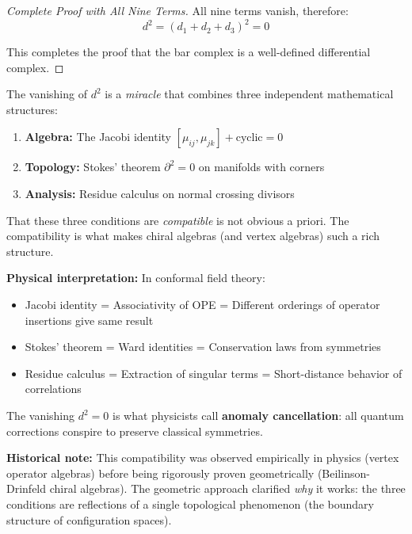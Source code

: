 \begin{proof}[Complete Proof with All Nine Terms]
All nine terms vanish, therefore:
$$d^2 = (d_1 + d_2 + d_3)^2 = 0$$

This completes the proof that the bar complex is a well-defined differential complex.
\end{proof}

\begin{remark}\label{rem:geometric-miracle}
The vanishing of $d^2$ is a \emph{miracle} that combines three independent mathematical structures:

\begin{enumerate}
\item \textbf{Algebra:} The Jacobi identity $[\mu_{ij}, \mu_{jk}] + \text{cyclic} = 0$
\item \textbf{Topology:} Stokes' theorem $\partial^2 = 0$ on manifolds with corners
\item \textbf{Analysis:} Residue calculus on normal crossing divisors
\end{enumerate}

That these three conditions are \emph{compatible} is not obvious a priori. The compatibility is what makes chiral algebras (and vertex algebras) such a rich structure.

\textbf{Physical interpretation:} In conformal field theory:
\begin{itemize}
\item Jacobi identity = Associativity of OPE = Different orderings of operator insertions give same result
\item Stokes' theorem = Ward identities = Conservation laws from symmetries
\item Residue calculus = Extraction of singular terms = Short-distance behavior of correlations
\end{itemize}

The vanishing $d^2 = 0$ is what physicists call \textbf{anomaly cancellation}: all quantum corrections conspire to preserve classical symmetries.

\textbf{Historical note:} This compatibility was observed empirically in physics (vertex operator algebras) before being rigorously proven geometrically (Beilinson-Drinfeld chiral algebras). The geometric approach clarified \emph{why} it works: the three conditions are reflections of a single topological phenomenon (the boundary structure of configuration spaces).
\end{remark}

